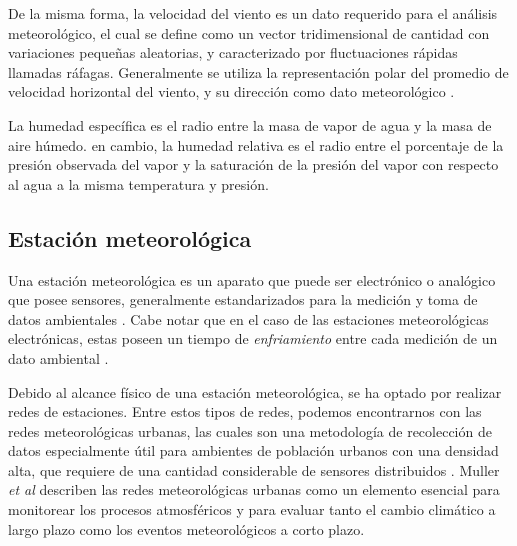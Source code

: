 De la misma forma, la velocidad del viento es un dato requerido para el análisis meteorológico, el cual se define como un vector tridimensional de cantidad con variaciones pequeñas aleatorias, y caracterizado por fluctuaciones rápidas llamadas ráfagas. Generalmente se utiliza la representación polar del promedio de velocidad horizontal del viento, y su dirección como dato meteorológico \cite{CIMO_2008}.

La humedad específica es el radio entre la masa de vapor de agua y la masa de aire húmedo. en cambio, la humedad relativa es el radio entre el porcentaje de la presión observada del vapor y la saturación de la presión del vapor con respecto al agua a la misma temperatura y presión.

\subsection{Estación meteorológica}

Una estación meteorológica es un aparato que puede ser electrónico o analógico que posee sensores, generalmente estandarizados para la medición y toma de datos ambientales \cite{CIMO_2008}. Cabe notar que en el caso de las estaciones meteorológicas electrónicas, estas poseen un tiempo de \textit{enfriamiento} entre cada medición de un dato ambiental \cite{davis:6152C_6162C_SS}.

Debido al alcance físico de una estación meteorológica, se ha optado por realizar redes de estaciones. Entre estos tipos de redes, podemos encontrarnos con las redes meteorológicas urbanas, las cuales son una metodología de recolección de datos especialmente útil para ambientes de población urbanos con una densidad alta, que requiere de una cantidad considerable de sensores distribuidos . Muller \textit{et al} \cite{doi:10.1002/joc.3678} describen las redes meteorológicas urbanas como un elemento esencial para monitorear los procesos atmosféricos y para evaluar tanto el cambio climático a largo plazo como los eventos meteorológicos a corto plazo.








